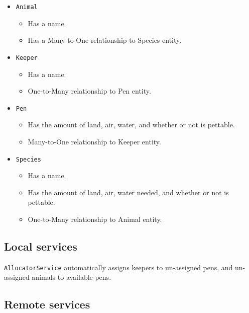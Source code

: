 \documentclass[english,a4paper,]{report}
\providecommand{\tightlist}{%
  \setlength{\itemsep}{0pt}\setlength{\parskip}{0pt}}
\begin{document}
\begin{itemize}
\tightlist
\item
  \texttt{Animal}

  \begin{itemize}
  \tightlist
  \item
    Has a name.
  \item
    Has a Many-to-One relationship to Species entity.
  \end{itemize}
\item
  \texttt{Keeper}

  \begin{itemize}
  \tightlist
  \item
    Has a name.
  \item
    One-to-Many relationship to Pen entity.
  \end{itemize}
\item
  \texttt{Pen}

  \begin{itemize}
  \tightlist
  \item
    Has the amount of land, air, water, and whether or not is pettable.
  \item
    Many-to-One relationship to Keeper entity.
  \end{itemize}
\item
  \texttt{Species}

  \begin{itemize}
  \tightlist
  \item
    Has a name.
  \item
    Has the amount of land, air, water needed, and whether or not is
    pettable.
  \item
    One-to-Many relationship to Animal entity.
  \end{itemize}
\end{itemize}

\hypertarget{local-services}{%
\subsection{Local services}\label{local-services}}

\texttt{AllocatorService} automatically assigns keepers to un-assigned
pens, and un-assigned animals to available pens.

\hypertarget{remote-services}{%
\subsection{Remote services}\label{remote-services}}
\end{document}
